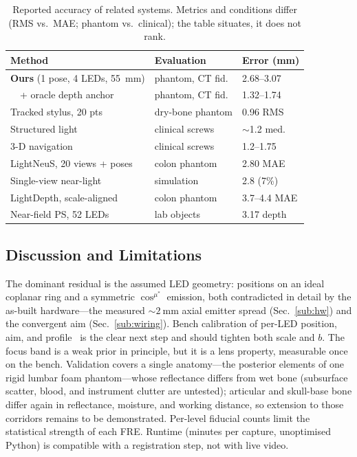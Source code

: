\documentclass[conference]{IEEEtran}
\begin{document}
\begin{table}[t]\centering
\caption{Reported accuracy of related systems.  Metrics and conditions
differ (RMS vs.\ MAE; phantom vs.\ clinical); the table situates, it does
not rank.}
\label{tab:context}\footnotesize
\setlength{\tabcolsep}{2.8pt}
\begin{tabular}{lll}
\toprule
Method & Evaluation & Error (mm)\\
\midrule
\textbf{Ours} (1 pose, 4 LEDs, \SI{55}{\milli\meter}) & phantom, CT fid. & 2.68--3.07\\
\ \ + oracle depth anchor & phantom, CT fid. & 1.32--1.74\\
Tracked stylus, 20 pts~\cite{tamura2005} & dry-bone phantom & 0.96 RMS\\
Structured light~\cite{jakubovic2018} & clinical screws & ${\sim}$1.2 med.\\
3-D navigation~\cite{guha2017} & clinical screws & 1.2--1.75\\
LightNeuS, 20 views + poses~\cite{batlle2023lightneus} & colon phantom & 2.80 MAE\\
Single-view near-light~\cite{batlle2022photometric} & simulation & 2.8 (7\%)\\
LightDepth, scale-aligned~\cite{rodriguezpuigvert2023lightdepth} & colon phantom & 3.7--4.4 MAE\\
Near-field PS, 52 LEDs~\cite{mecca2021luces} & lab objects & 3.17 depth\\
\bottomrule
\end{tabular}
\end{table}

\subsection{Discussion and Limitations}\label{sub:lim}
The dominant residual is the assumed LED geometry: positions on an ideal
coplanar ring and a symmetric $\cos^{\mu^\ast}$ emission, both
contradicted in detail by the as-built hardware---the measured
${\sim}\SI{2}{\milli\meter}$ axial emitter spread (Sec.~\ref{sub:hw}) and
the convergent aim (Sec.~\ref{sub:wiring}).  Bench calibration of per-LED
position, aim, and
profile~\cite{queau2018led,ma2023robust,park2014nonisotropic} is the
clear next step and should tighten both scale and $b$.  The focus band is
a weak prior in principle, but it is a lens property, measurable once on
the bench.  Validation covers a single anatomy---the posterior elements of one
rigid lumbar foam phantom---whose reflectance differs from wet bone
(subsurface scatter, blood, and instrument clutter are untested);
articular and skull-base bone differ again in reflectance, moisture, and
working distance, so extension to those corridors remains to be
demonstrated.  Per-level fiducial counts limit the statistical strength
of each FRE.  Runtime (minutes per capture, unoptimised Python) is
compatible with a registration step, not with live video.
\end{document}

